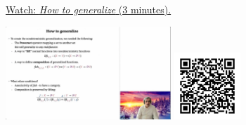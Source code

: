 
\begin{minipage}{10cm}
    \href{https://act4e-spring21.netlify.app/videos/spring2021-monads-a:how-to-gen-monads.html}{Watch: \emph{How to generalize} (3 minutes).}
        
    \href{https://act4e-spring21.netlify.app/videos/spring2021-monads-a:how-to-gen-monads.html}{\includegraphics[height=3.5cm]{spring2021-monads-a:how-to-gen-monads/thumbnails.jpg}}
    \href{https://act4e-spring21.netlify.app/videos/spring2021-monads-a:how-to-gen-monads.html}{\includegraphics[height=2.5cm]{spring2021-monads-a:how-to-gen-monads/qrcode.png}}
\end{minipage}
